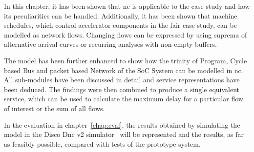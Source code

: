 In this chapter, it has been shown that \gls{nc} is applicable to the case study and how its peculiarities can be handled.
Additionally, it has been shown that machine schedules, which control accelerator components in the \gls{fair} case study, can be modelled as network flows.
Changing flows can be expressed by using suprema of alternative arrival curves or recurring analyses with non-empty buffers.
\par
The model has been further enhanced to show how the trinity of Program, Cycle based Bus and packet based Network of the SoC System can be modelled in \gls{nc}.
All sub-modules have been discussed in detail and service representations have been deduced. The findings were then combined
to produce a single equivalent service, which can be used to calculate the maximum delay for a particular flow of interest or the sum of all flows.
\par
In the evaluation in chapter~\ref{chap:eval}, the results obtained by simulating the model in the Disco D\gls{nc} v2 simulator~\cite{bondorf_discodnc_2014} will be represented and the 
results, as far as feasibly possible, compared with tests of the prototype system.
